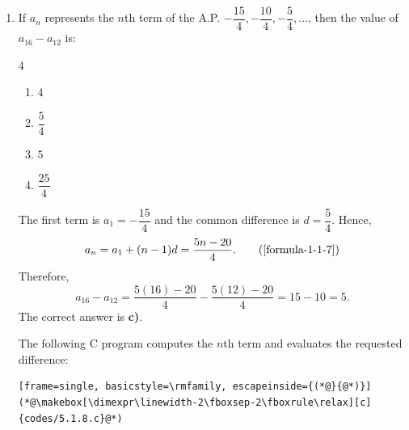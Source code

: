 \begin{enumerate}[label={},leftmargin=1.15cm,labelwidth=1.0cm,labelsep=0.15cm,itemindent=0pt,listparindent=0pt,parsep=0pt,topsep=0pt]
\item[5.1.8] If $a_n$ represents the $n$th term of the A.P. $-\dfrac{15}{4},-\dfrac{10}{4},-\dfrac{5}{4},\ldots$, then the value of $a_{16}-a_{12}$ is:

\begin{multicols}{4}
\begin{enumerate}
\setlength{\itemsep}{0pt}
    \item $4$
    \item $\dfrac{5}{4}$
    \item $5$
    \item $\dfrac{25}{4}$
\end{enumerate}
\end{multicols}

\vspace{0.7em}\par\solution


The first term is $a_1=-\dfrac{15}{4}$ and the common difference is $d=\dfrac{5}{4}$. Hence,
\begin{equation*}
a_n=a_1+(n-1)d=\frac{5n-20}{4}.
\tag*{(\ref{formula-1-1-7})}\end{equation*}
Therefore,
\[
a_{16}-a_{12}=\frac{5(16)-20}{4}-\frac{5(12)-20}{4}=15-10=5.
\]
The correct answer is \textbf{c)}.

The following C program computes the $n$th term and evaluates the requested difference:
\begin{lstlisting}[frame=single, basicstyle=\rmfamily, escapeinside={(*@}{@*)}]
(*@\makebox[\dimexpr\linewidth-2\fboxsep-2\fboxrule\relax][c]{codes/5.1.8.c}@*)
\end{lstlisting}

\end{enumerate}
\vspace{1.2em}
